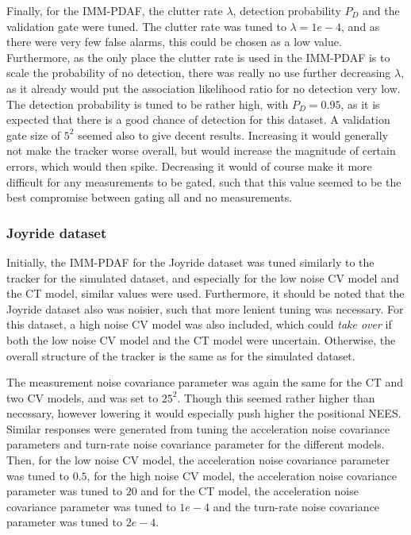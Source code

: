 Finally, for the IMM-PDAF, the clutter rate $\lambda$, detection probability $P_D$ and the validation gate were tuned. The clutter rate was tuned to $\lambda = 1e-4$, and as there were very few false alarms, this could be chosen as a low value. Furthermore, as the only place the clutter rate is used in the IMM-PDAF is to scale the probability of no detection, there was really no use further decreasing $\lambda$, as it already would put the association likelihood ratio for no detection very low. The detection probability is tuned to be rather high, with $P_D = 0.95$, as it is expected that there is a good chance of detection for this dataset. A validation gate size of $5^2$ seemed also to give decent results. Increasing it would generally not make the tracker worse overall, but would increase the magnitude of certain errors, which would then spike. Decreasing it would of course make it more difficult for any measurements to be gated, such that this value seemed to be the best compromise between gating all and no measurements. 

\subsubsection*{Joyride dataset}
Initially, the IMM-PDAF for the Joyride dataset was tuned similarly to the tracker for the simulated dataset, and especially for the low noise CV model and the CT model, similar values were used. Furthermore, it should be noted that the Joyride dataset also was noisier, such that more lenient tuning was necessary. For this dataset, a high noise CV model was also included, which could \textit{take over} if both the low noise CV model and the CT model were uncertain. Otherwise, the overall structure of the tracker is the same as for the simulated dataset. 

The measurement noise covariance parameter was again the same for the CT and two CV models, and was set to $25^2$. Though this seemed rather higher than necessary, however lowering it would especially push higher the positional NEES. Similar responses were generated from tuning the acceleration noise covariance parameters and turn-rate noise covariance parameter for the different models. Then, for the low noise CV model, the acceleration noise covariance parameter was tuned to $0.5$, for the high noise CV model, the acceleration noise covariance parameter was tuned to $20$ and for the CT model, the acceleration noise covariance parameter was tuned to $1e-4$ and the turn-rate noise covariance parameter was tuned to $2e-4$. 

